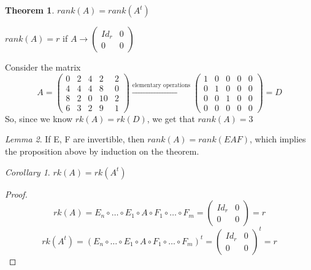 \documentclass[12pt]{article}
\newtheorem{theorem}{Theorem}[section]
\theoremstyle{definition}
\theoremstyle{remark}
\newtheorem{corollary}{Corollary}[theorem]
\newtheorem{lemma}[theorem]{Lemma}
\begin{document}
\begin{theorem}
    $rank(A) = rank(A^t)$
\end{theorem}
\begin{proposition}
    $rank(A) = r $ if $ A \rightarrow \begin{pmatrix}
        Id_r & 0\\ 0&0
    \end{pmatrix}$
\end{proposition}
\begin{example}
    Consider the matrix $$A = \begin{pmatrix}
        0&2&4&2&2\\4&4&4&8&0\\8&2&0&10&2\\6&3&2&9&1
    \end{pmatrix} \xrightarrow{\text{elementary operations}} 
    \begin{pmatrix}
        1&0&0&0&0\\0&1&0&0&0\\0&0&1&0&0\\0&0&0&0&0
    \end{pmatrix} = D$$
    So, since we know $rk(A) = rk(D)$, we get that $rank(A)= 3$
\end{example}

\begin{lemma}
    If E, F are invertible, then $rank(A) = rank(EAF)$, which implies the proposition above by induction on the theorem. 
\end{lemma}
\begin{corollary}
    $rk(A) =rk(A^t)$

    \begin{proof}
        
    
    $$rk(A) = E_n \circ \hdots \circ E_1 \circ A \circ F_1 \circ \hdots \circ F_m = \begin{pmatrix}
        Id_r & 0\\ 0&0
    \end{pmatrix} = r $$
    $$ rk(A^t) = (E_n \circ \hdots \circ E_1 \circ A \circ F_1 \circ \hdots \circ F_m)^t = \begin{pmatrix}
        Id_r & 0\\ 0&0
    \end{pmatrix}^t = r $$
    \end{proof}
\end{corollary}
\end{document}
